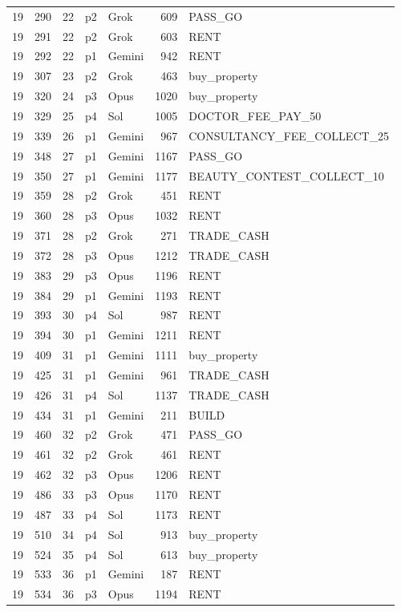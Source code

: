 \begin{longtable}{r r r l l r L{2.2in}}
19 & 290 & 22 & p2 & Grok & 609 & PASS\_GO \\
19 & 291 & 22 & p2 & Grok & 603 & RENT \\
19 & 292 & 22 & p1 & Gemini & 942 & RENT \\
19 & 307 & 23 & p2 & Grok & 463 & buy\_property \\
19 & 320 & 24 & p3 & Opus & 1020 & buy\_property \\
19 & 329 & 25 & p4 & Sol & 1005 & DOCTOR\_FEE\_PAY\_50 \\
19 & 339 & 26 & p1 & Gemini & 967 & CONSULTANCY\_FEE\_COLLECT\_25 \\
19 & 348 & 27 & p1 & Gemini & 1167 & PASS\_GO \\
19 & 350 & 27 & p1 & Gemini & 1177 & BEAUTY\_CONTEST\_COLLECT\_10 \\
19 & 359 & 28 & p2 & Grok & 451 & RENT \\
19 & 360 & 28 & p3 & Opus & 1032 & RENT \\
19 & 371 & 28 & p2 & Grok & 271 & TRADE\_CASH \\
19 & 372 & 28 & p3 & Opus & 1212 & TRADE\_CASH \\
19 & 383 & 29 & p3 & Opus & 1196 & RENT \\
19 & 384 & 29 & p1 & Gemini & 1193 & RENT \\
19 & 393 & 30 & p4 & Sol & 987 & RENT \\
19 & 394 & 30 & p1 & Gemini & 1211 & RENT \\
19 & 409 & 31 & p1 & Gemini & 1111 & buy\_property \\
19 & 425 & 31 & p1 & Gemini & 961 & TRADE\_CASH \\
19 & 426 & 31 & p4 & Sol & 1137 & TRADE\_CASH \\
19 & 434 & 31 & p1 & Gemini & 211 & BUILD \\
19 & 460 & 32 & p2 & Grok & 471 & PASS\_GO \\
19 & 461 & 32 & p2 & Grok & 461 & RENT \\
19 & 462 & 32 & p3 & Opus & 1206 & RENT \\
19 & 486 & 33 & p3 & Opus & 1170 & RENT \\
19 & 487 & 33 & p4 & Sol & 1173 & RENT \\
19 & 510 & 34 & p4 & Sol & 913 & buy\_property \\
19 & 524 & 35 & p4 & Sol & 613 & buy\_property \\
19 & 533 & 36 & p1 & Gemini & 187 & RENT \\
19 & 534 & 36 & p3 & Opus & 1194 & RENT \\

\end{longtable}
